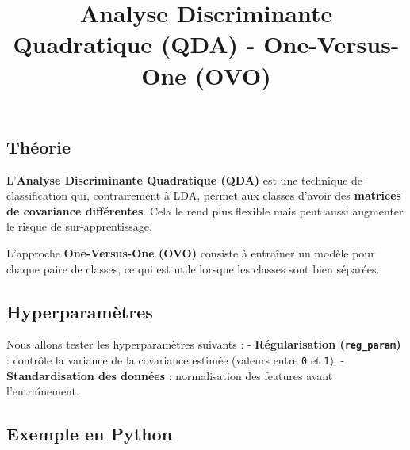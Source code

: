 \documentclass[
  letterpaper,
  DIV=11,
  numbers=noendperiod]{scrartcl}
\title{Analyse Discriminante Quadratique (QDA) - One-Versus-One (OVO)}
\author{}
\date{}
\begin{document}
\maketitle


\subsection{Théorie}\label{thuxe9orie}

L'\textbf{Analyse Discriminante Quadratique (QDA)} est une technique de
classification qui, contrairement à LDA, permet aux classes d'avoir des
\textbf{matrices de covariance différentes}. Cela le rend plus flexible
mais peut aussi augmenter le risque de sur-apprentissage.

L'approche \textbf{One-Versus-One (OVO)} consiste à entraîner un modèle
pour chaque paire de classes, ce qui est utile lorsque les classes sont
bien séparées.

\subsection{Hyperparamètres}\label{hyperparamuxe8tres}

Nous allons tester les hyperparamètres suivants : -
\textbf{Régularisation (\texttt{reg\_param})} : contrôle la variance de
la covariance estimée (valeurs entre \texttt{0} et \texttt{1}). -
\textbf{Standardisation des données} : normalisation des features avant
l'entraînement.

\subsection{Exemple en Python}\label{exemple-en-python}
\end{document}
